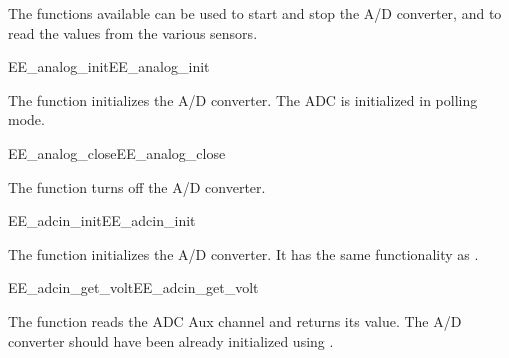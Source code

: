 The functions available can be used to start and stop the A/D
converter, and to read the values from the various sensors.


\begin{function_nopb2}{EE\_analog\_init}{EE_analog_init}
  
  \begin{fundescription}
    The function initializes the A/D converter. 
    The ADC is initialized in polling mode.
  \end{fundescription}
  
  
  
\end{function_nopb2}

\begin{function_nopb2}{EE\_analog\_close}{EE_analog_close}
  
  \begin{fundescription}
    The function turns off the A/D converter. 
  \end{fundescription}
\end{function_nopb2}


\begin{function_nopb2}{EE\_adcin\_init}{EE_adcin_init}
  
  \begin{fundescription}
    The function initializes the A/D converter. 
    It has the same functionality as .
  \end{fundescription}
\end{function_nopb2}

\begin{function_nopb2}{EE\_adcin\_get\_volt}{EE_adcin_get_volt}
  
  \begin{fundescription}
    The function reads the ADC Aux channel and returns its value. The
    A/D converter should have
    been already initialized using .
  \end{fundescription}
  
  \begin{funreturn}
  \end{funreturn}
\end{function_nopb2}



